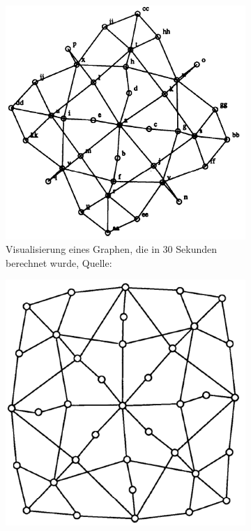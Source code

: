 \documentclass[12pt, a4paper]{article}
\begin{document}
\begin{figure}[h!]
\begin{subfigure}[b]{0.45\textwidth}
\includegraphics[width=\textwidth]{Fruchterman_Reingold_G1_30sec.png}
\caption[Visualisierung eines Graphen, die in 30 Sekunden berechnet wurde]{Visualisierung eines Graphen, die in 30 Sekunden berechnet wurde, Quelle: \protect{}}
\label{Fruchterman_Reingold_G1_30sec}
\end{subfigure}
\begin{subfigure}[b]{0.45\textwidth}
\includegraphics[width=\textwidth]{Davidson_Harel_G1_10min.png}

\end{subfigure}
\end{figure}
\end{document}
